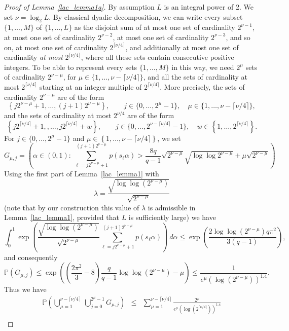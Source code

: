 \documentclass[12pt]{amsart}
\newcommand {\p} {\mathbb{P}}
\begin{document}
\begin{proof}[Proof of Lemma~\ref{lac_lemma1a}] 
By assumption $L$ is an integral power of 2. We set $\nu = \log_2 L$. By classical dyadic decomposition, we can write every subset $\{1, \dots, M\}$ of $\{1, \dots, L\}$ as the disjoint sum of at most one set of cardinality $2^{\nu-1}$, at most one set of cardinality $2^{\nu-2}$, at most one set of cardinality $2^{\nu-3}$, and so on, at most one set of cardinality $2^{\lceil \nu/4 \rceil}$, and additionally at most one set of cardinality \emph{at most} $2^{\lceil \nu/4 \rceil}$, where all these sets contain consecutive positive integers. To be able to represent every sets $\{1, \dots, M\}$ in this way, we need $2^{\mu}$ sets of cardinality $2^{\nu - \mu}$, for $\mu \in \{1, \dots, \nu-\lceil \nu/4 \rceil\}$, and all the sets of cardinality at most $2^{\lceil \nu/4 \rceil}$ starting at an integer multiple of $2^{\lceil \nu/4 \rceil}$. More precisely, the sets of cardinality $2^{\nu-\mu}$ are of the form
$$
\left\{j 2^{\nu-\mu}+1, \dots, (j+1) 2^{\nu-\mu} \right\}, \qquad j \in \{0, \dots, 2^{\mu}-1\}, \quad \mu \in \{1, \dots, \nu- \lceil \nu/4\rceil\},
$$
and the sets of cardinality at most $2^{\nu/4}$ are of the form 
$$
\left\{j 2^{\lceil \nu/4 \rceil} + 1, , \dots, j 2^{\lceil \nu/4 \rceil} + w \right\}, \qquad j \in \{0, \dots, 2^{\nu - \lceil \nu/4 \rceil} -1 \}, \quad w \in \left\{1, \dots, 2^{\lceil \nu/4 \rceil}\right\}.
$$
For $j \in \{0, \dots, 2^{\mu}-1\}$ and $\mu \in \left\{1, \dots, \nu - \lceil \nu/4 \rceil \right\}$, we set
$$
G_{\mu,j} = \left( \alpha \in (0,1):~\sum_{\ell=j 2^{\nu-\mu}+1}^{(j+1) 2^{\nu-\mu}} p(s_\ell \alpha) >  \frac{8 q}{q-1} \sqrt{2^{\nu-\mu}} \sqrt{\log \log 2^{\nu-\mu}} + \mu \sqrt{2^{\nu-\mu}} \right)
$$
Using the first part of Lemma~\ref{lac_lemma1} with 
$$
\lambda = \frac{\sqrt{\log \log (2^{\nu-\mu})}}{\sqrt{2^{\nu-\mu}}}
$$
(note that by our construction this value of $\lambda$ is admissible in Lemma~\ref{lac_lemma1}, provided that $L$ is sufficiently large) we have
$$
\int_0^1 \exp\left(\frac{\sqrt{\log \log (2^{\nu-\mu})}}{\sqrt{2^{\nu-\mu}}} \sum_{\ell=j 2^{\nu-\mu}+1}^{(j+1) 2^{\nu-\mu}} p(s_\ell \alpha) \right) ~d\alpha \leq \exp \left( \frac{2 \log \log (2^{\nu-\mu}) q \pi^2}{3(q-1)} \right),
$$
and consequently 
$$
\p (G_{\mu,j}) \leq \exp \left( \left(\frac{2 \pi^2}{3} - 8 \right) \frac{q}{q-1} \log \log (2^{\nu-\mu}) - \mu \right) \leq \frac{1}{e^{\mu} (\log (2^{\nu-\mu}))^{1.4}}.
$$
Thus we have
\begin{eqnarray}
\p \left(\bigcup_{\mu=1}^{\nu- \lceil \nu/4 \rceil} ~ \bigcup_{j=0}^{2^{\mu}-1} G_{\mu,j} \right) & \leq & \sum_{\mu=1}^{\nu - \lceil \nu/4 \rceil} \frac{2^\mu}{e^{\mu} \left(\log \left(2^{\lceil \nu/4 \rceil}\right)\right)^{1.4}} \nonumber\\

\end{eqnarray}
\end{proof}
\end{document}
